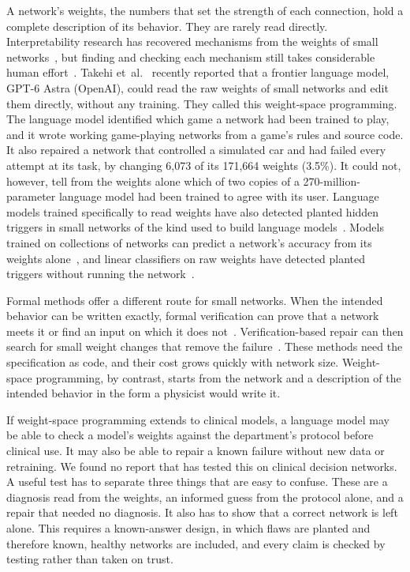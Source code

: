 \documentclass[aps,prx,reprint,superscriptaddress,nofootinbib]{revtex4-2}
\begin{document}
A network's weights, the numbers that set the strength of each connection, hold a complete
description of its behavior. They are rarely read directly. Interpretability research has recovered
mechanisms from the weights of small networks~\cite{elhage2021,nanda2023}, but finding and checking
each mechanism still takes considerable human effort~\cite{schwettmann2023,conmy2023}. Takehi
et~al.~\cite{takehi2026} recently reported that a frontier language model, GPT-6 Astra (OpenAI),
could read the raw weights of small networks and edit them directly, without any training. They
called this weight-space programming. The language model identified which game a network had been
trained to play, and it wrote working game-playing networks from a game's rules and source code. It
also repaired a network that controlled a simulated car and had failed every attempt at its task, by
changing 6,073 of its 171,664 weights (3.5\%). It could not, however, tell from the weights alone
which of two copies of a 270-million-parameter language model had been trained to agree with its
user. Language models trained specifically to read weights have also detected planted hidden
triggers in small networks of the kind used to build language models~\cite{kabra2026}. Models
trained on collections of networks can predict a network's accuracy from its weights
alone~\cite{unterthiner2020}, and linear classifiers on raw weights have detected planted triggers
without running the network~\cite{huster2024}.

Formal methods offer a different route for small networks. When the intended behavior can be written
exactly, formal verification can prove that a network meets it or find an input on which it does
not~\cite{katz2017,tjeng2019}. Verification-based repair can then search for small weight changes
that remove the failure~\cite{goldberger2020,sotoudeh2021}. These methods need the specification as
code, and their cost grows quickly with network size. Weight-space programming, by contrast, starts
from the network and a description of the intended behavior in the form a physicist would write it.

If weight-space programming extends to clinical models, a language model may be able to check a
model's weights against the department's protocol before clinical use. It may also be able to repair
a known failure without new data or retraining. We found no report that has tested this on clinical
decision networks. A useful test has to separate three things that are easy to confuse. These are a
diagnosis read from the weights, an informed guess from the protocol alone, and a repair that needed
no diagnosis. It also has to show that a correct network is left alone. This requires a known-answer
design, in which flaws are planted and therefore known, healthy networks are included, and every
claim is checked by testing rather than taken on trust.
\end{document}
